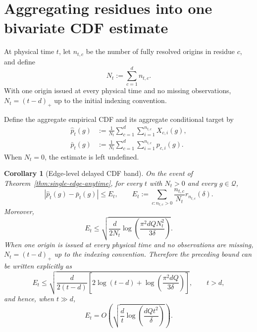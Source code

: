 \documentclass[11pt]{article}
\newtheorem{corollary}[theorem]{Corollary}
\newcommand{\Q}{\mathcal{Q}}
\newcommand{\1}{\mathbf{1}}
\begin{document}
\section{Aggregating residues into one bivariate CDF estimate}

At physical time $t$, let $n_{t,c}$ be the number of fully resolved origins in
residue $c$, and define
\[
    N_t:=\sum_{c=1}^d n_{t,c}.
\]
With one origin issued at every physical time and no missing observations,
$N_t=(t-d)_+$ up to the initial indexing convention.

Define the aggregate empirical CDF and its aggregate conditional target by
\begin{align}
    \widehat p_t(g)
    &:=
    \frac1{N_t}
    \sum_{c=1}^d
    \sum_{i=1}^{n_{t,c}}
    X_{c,i}(g),
    \label{eq:aggregate-empirical}
    \\
    \bar p_t(g)
    &:=
    \frac1{N_t}
    \sum_{c=1}^d
    \sum_{i=1}^{n_{t,c}}
    p_{c,i}(g).
    \label{eq:aggregate-target}
\end{align}
When $N_t=0$, the estimate is left undefined.

\begin{corollary}[Edge-level delayed CDF band]
\label{cor:aggregate-band}
On the event of Theorem~\ref{thm:single-edge-anytime}, for every $t$ with
$N_t>0$ and every $g\in\Q$,
\begin{equation}
    \left|
        \widehat p_t(g)-\bar p_t(g)
    \right|
    \le
    E_t,
    \qquad
    E_t
    :=
    \sum_{c:n_{t,c}>0}
    \frac{n_{t,c}}{N_t}
    r_{n_{t,c}}(\delta).
    \label{eq:exact-Et}
\end{equation}
Moreover,
\begin{equation}
    \boxed{
    E_t
    \le
    \sqrt{
        \frac{d}{2N_t}
        \log\!\left(
            \frac{\pi^2 dQ N_t^2}{3\delta}
        \right)
    }.
    }
    \label{eq:simple-Et}
\end{equation}
When one origin is issued at every physical time and no observations are
missing, $N_t=(t-d)_+$ up to the indexing convention.  Therefore the preceding
bound can be written explicitly as
\[
    E_t
    \le
    \sqrt{
        \frac{d}{2(t-d)}
        \left[
            2\log(t-d)
            +
            \log\!\left(\frac{\pi^2 dQ}{3\delta}\right)
        \right]
    },
    \qquad t>d,
\]
and hence, when $t\gg d$,
\[
    E_t
    =
    O\!\left(
        \sqrt{
            \frac{d}{t}
            \log\!\left(\frac{dQt^2}{\delta}\right)
        }
    \right).
\]
\end{corollary}
\end{document}
